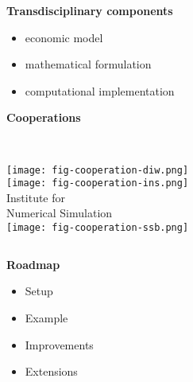   \begin{frame}\textbf{Transdisciplinary components}\vspace{0.3cm}

  \begin{itemize}\setlength\itemsep{1em}
  \item economic model
  \item mathematical formulation
  \item computational implementation
  \end{itemize}
  \end{frame}
  \begin{frame}
  \textbf{Cooperations}\vspace{0.5cm}
  \begin{columns}[t]
  	\centering \\
  	\texttt{[image: fig-cooperation-diw.png]}\\
  	\vspace{1.0cm}
  	\texttt{[image: fig-cooperation-ins.png]} \\
  	\vspace{-0.5cm}
  	\footnotesize{Institute for \\ Numerical Simulation}
  	\centering \\
  	\texttt{[image: fig-cooperation-ssb.png]} \\
  	\vspace{-0.2cm}
  \end{columns}
  \end{frame}
\begin{frame}
\textbf{Roadmap}\vspace{0.5cm}
\begin{itemize}\setlength\itemsep{1em}
\item Setup
\item Example
\item Improvements
\item Extensions
\end{itemize}
\end{frame}

